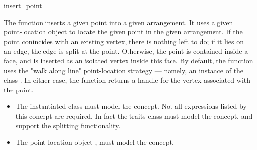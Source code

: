 \ccRefPageBegin

\begin{ccRefFunction}{insert_point}

\ccDefinition

The function \ccRefName{} inserts a given point into a given arrangement.
It uses a given point-location object to locate the given
point in the given arrangement. If the point conincides with an existing
vertex, there is nothing left to do; if it lies on an edge, the edge is
split at the point. Otherwise, the point is contained inside a face, and is
inserted as an isolated vertex inside this face.
By default, the function uses the "walk along line" point-location
strategy --- namely, an instance of the class
.
In either case, the function returns a handle for the vertex associated
with the point.



\ccRequirements
\begin{itemize}
\item The instantiated  class must model the
   concept. Not all expressions listed 
  by this concept are required. In fact the traits class must model the 
   concept, and support the splitting
  functionality.
\item The point-location object , must model the
   concept.
\end{itemize}

\end{ccRefFunction}

\ccRefPageEnd
